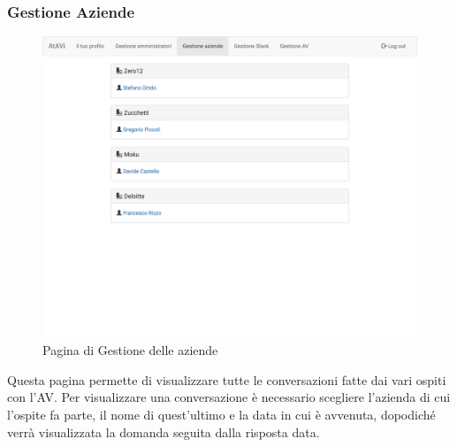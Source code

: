 \documentclass[../ManualeUtente_v1.0.0.tex]{subfiles}
\begin{document}
	\subsubsection{Gestione Aziende}
	\begin{figure}[!h]
		\centering
		\includegraphics[scale=0.15]{Screenshot/admin-manageFirms.png}
		\caption{Pagina di Gestione delle aziende}
	\end{figure}
	Questa pagina permette di visualizzare tutte le conversazioni fatte dai vari ospiti con l'AV. Per visualizzare una conversazione è necessario scegliere l'azienda di cui l'ospite fa parte, il nome di quest'ultimo e la data in cui è avvenuta, dopodiché verrà visualizzata la domanda seguita dalla risposta data.
	
	\newpage
\end{document}
